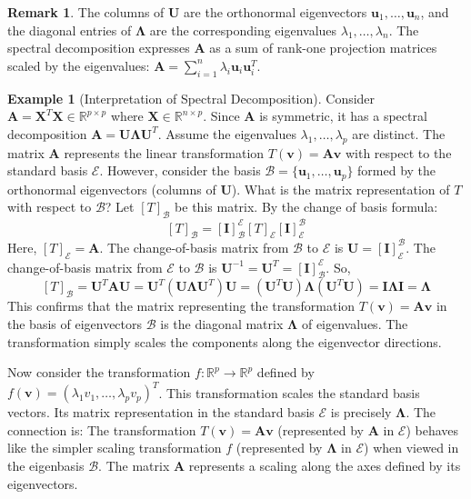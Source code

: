 \documentclass[12pt, letterpaper]{article}
\theoremstyle{definition}
\newtheorem{example}{Example}[section]
\newtheorem{remark}{Remark}[section]
\newcommand{\R}{\mathbb{R}}
\newcommand{\B}{\mathcal{B}}
\newcommand{\E}{\mathcal{E}}
\newcommand{\mat}[1]{\mathbf{#1}} %
\newcommand{\vect}[1]{\mathbf{#1}} %
\renewcommand{\v}{\vect{v}} %
\newcommand{\uvec}{\vect{u}} %
\begin{document}
\begin{remark}
The columns of $\mat{U}$ are the orthonormal eigenvectors $\uvec_1, \dots, \uvec_n$, and the diagonal entries of $\mat{\Lambda}$ are the corresponding eigenvalues $\lambda_1, \dots, \lambda_n$. The spectral decomposition expresses $\mat{A}$ as a sum of rank-one projection matrices scaled by the eigenvalues: $\mat{A} = \sum_{i=1}^n \lambda_i \uvec_i \uvec_i^T$.
\end{remark}

\begin{example}[Interpretation of Spectral Decomposition]
Consider $\mat{A} = \mat{X}^T \mat{X} \in \R^{p \times p}$ where $\mat{X} \in \R^{n \times p}$. Since $\mat{A}$ is symmetric, it has a spectral decomposition $\mat{A} = \mat{U} \mat{\Lambda} \mat{U}^T$. Assume the eigenvalues $\lambda_1, \dots, \lambda_p$ are distinct.
The matrix $\mat{A}$ represents the linear transformation $T(\v) = \mat{A}\v$ with respect to the standard basis $\E$.
However, consider the basis $\B = \{\uvec_1, \dots, \uvec_p\}$ formed by the orthonormal eigenvectors (columns of $\mat{U}$). What is the matrix representation of $T$ with respect to $\B$?
Let $[T]_\B$ be this matrix. By the change of basis formula:
\[ [T]_\B = [\mat{I}]_\B^\E [T]_\E [\mat{I}]_\E^\B \]
Here, $[T]_\E = \mat{A}$. The change-of-basis matrix from $\B$ to $\E$ is $\mat{U} = [\mat{I}]_\E^\B$. The change-of-basis matrix from $\E$ to $\B$ is $\mat{U}^{-1} = \mat{U}^T = [\mat{I}]_\B^\E$.
So,
\[ [T]_\B = \mat{U}^T \mat{A} \mat{U} = \mat{U}^T (\mat{U} \mat{\Lambda} \mat{U}^T) \mat{U} = (\mat{U}^T \mat{U}) \mat{\Lambda} (\mat{U}^T \mat{U}) = \mat{I} \mat{\Lambda} \mat{I} = \mat{\Lambda} \]
This confirms that the matrix representing the transformation $T(\v) = \mat{A}\v$ in the basis of eigenvectors $\B$ is the diagonal matrix $\mat{\Lambda}$ of eigenvalues. The transformation simply scales the components along the eigenvector directions.

Now consider the transformation $f: \R^p \to \R^p$ defined by $f(\v) = (\lambda_1 v_1, \dots, \lambda_p v_p)^T$. This transformation scales the standard basis vectors. Its matrix representation in the standard basis $\E$ is precisely $\mat{\Lambda}$.
The connection is: The transformation $T(\v) = \mat{A}\v$ (represented by $\mat{A}$ in $\E$) behaves like the simpler scaling transformation $f$ (represented by $\mat{\Lambda}$ in $\E$) when viewed in the eigenbasis $\B$. The matrix $\mat{A}$ represents a scaling along the axes defined by its eigenvectors.
\end{example}
\end{document}
